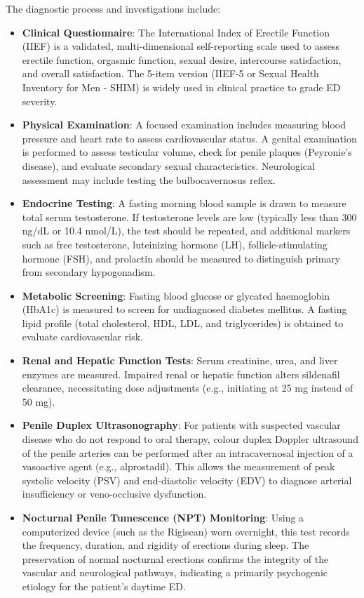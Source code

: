 The diagnostic process and investigations include:
\begin{itemize}
    \item \textbf{Clinical Questionnaire}: The International Index of Erectile Function (IIEF) is a validated, multi-dimensional self-reporting scale used to assess erectile function, orgasmic function, sexual desire, intercourse satisfaction, and overall satisfaction. The 5-item version (IIEF-5 or Sexual Health Inventory for Men - SHIM) is widely used in clinical practice to grade ED severity.
    \item \textbf{Physical Examination}: A focused examination includes measuring blood pressure and heart rate to assess cardiovascular status. A genital examination is performed to assess testicular volume, check for penile plaques (Peyronie's disease), and evaluate secondary sexual characteristics. Neurological assessment may include testing the bulbocavernosus reflex.
    \item \textbf{Endocrine Testing}: A fasting morning blood sample is drawn to measure total serum testosterone. If testosterone levels are low (typically less than 300 ng/dL or 10.4 nmol/L), the test should be repeated, and additional markers such as free testosterone, luteinizing hormone (LH), follicle-stimulating hormone (FSH), and prolactin should be measured to distinguish primary from secondary hypogonadism.
    \item \textbf{Metabolic Screening}: Fasting blood glucose or glycated haemoglobin (HbA1c) is measured to screen for undiagnosed diabetes mellitus. A fasting lipid profile (total cholesterol, HDL, LDL, and triglycerides) is obtained to evaluate cardiovascular risk.
    \item \textbf{Renal and Hepatic Function Tests}: Serum creatinine, urea, and liver enzymes are measured. Impaired renal or hepatic function alters sildenafil clearance, necessitating dose adjustments (e.g., initiating at 25 mg instead of 50 mg).
    \item \textbf{Penile Duplex Ultrasonography}: For patients with suspected vascular disease who do not respond to oral therapy, colour duplex Doppler ultrasound of the penile arteries can be performed after an intracavernosal injection of a vasoactive agent (e.g., alprostadil). This allows the measurement of peak systolic velocity (PSV) and end-diastolic velocity (EDV) to diagnose arterial insufficiency or veno-occlusive dysfunction.
    \item \textbf{Nocturnal Penile Tumescence (NPT) Monitoring}: Using a computerized device (such as the Rigiscan) worn overnight, this test records the frequency, duration, and rigidity of erections during sleep. The preservation of normal nocturnal erections confirms the integrity of the vascular and neurological pathways, indicating a primarily psychogenic etiology for the patient's daytime ED.
\end{itemize}

